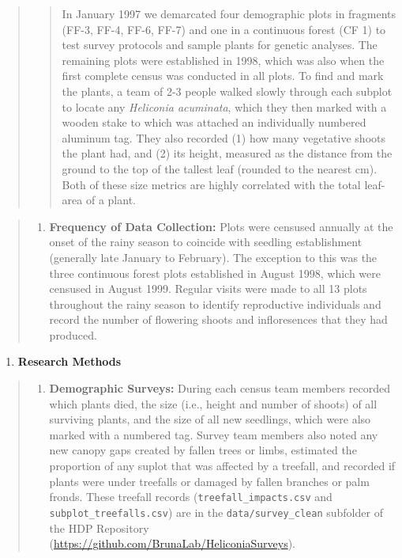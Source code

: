\documentclass[
  man, donotrepeattitle,floatsintext]{apa6}
\providecommand{\tightlist}{%
  \setlength{\itemsep}{0pt}\setlength{\parskip}{0pt}}
\begin{document}
\begin{quote}
\begin{quote}
In January 1997 we demarcated four demographic plots in fragments (FF-3, FF-4, FF-6, FF-7) and one in a continuous forest (CF 1) to test survey protocols and sample plants for genetic analyses. The remaining plots were established in 1998, which was also when the first complete census was conducted in all plots. To find and mark the plants, a team of 2-3 people walked slowly through each subplot to locate any \emph{Heliconia acuminata}, which they then marked with a wooden stake to which was attached an individually numbered aluminum tag. They also recorded (1) how many vegetative shoots the plant had, and (2) its height, measured as the distance from the ground to the top of the tallest leaf (rounded to the nearest cm). Both of these size metrics are highly correlated with the total leaf-area of a plant.
\end{quote}
\end{quote}

\begin{quote}
\begin{enumerate}
\def\labelenumi{\alph{enumi}.}
\setcounter{enumi}{2}
\tightlist
\item
  \textbf{Frequency of Data Collection:} Plots were censused annually at the onset of the rainy season to coincide with seedling establishment (generally late January to February). The exception to this was the three continuous forest plots established in August 1998, which were censused in August 1999. Regular visits were made to all 13 plots throughout the rainy season to identify reproductive individuals and record the number of flowering shoots and infloresences that they had produced.
\end{enumerate}
\end{quote}

\begin{enumerate}
\def\labelenumi{\arabic{enumi}.}
\setcounter{enumi}{2}
\tightlist
\item
  \textbf{Research Methods}
\end{enumerate}

\begin{quote}
\begin{enumerate}
\def\labelenumi{\alph{enumi}.}
\tightlist
\item
  \textbf{Demographic Surveys:} During each census team members recorded which plants died, the size (i.e., height and number of shoots) of all surviving plants, and the size of all new seedlings, which were also marked with a numbered tag. Survey team members also noted any new canopy gaps created by fallen trees or limbs, estimated the proportion of any suplot that was affected by a treefall, and recorded if plants were under treefalls or damaged by fallen branches or palm fronds. These treefall records (\texttt{treefall\_impacts.csv} and \texttt{subplot\_treefalls.csv}) are in the \texttt{data/survey\_clean} subfolder of the HDP Repository (\url{https://github.com/BrunaLab/HeliconiaSurveys}).
\end{enumerate}
\end{quote}
\end{document}
